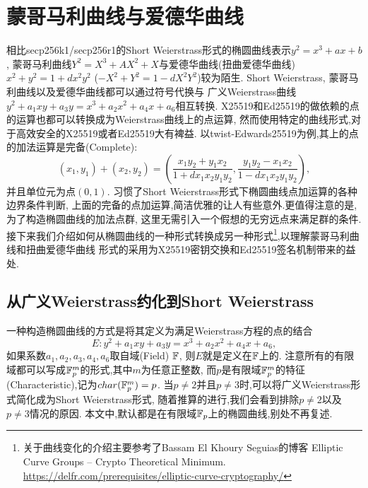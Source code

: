\section{蒙哥马利曲线与爱德华曲线}

相比secp256k1/secp256r1的Short Weierstrass形式的椭圆曲线表示$y^2 = x^3 + ax + b$,
蒙哥马利曲线$Y^2 = X^3 + AX^2 + X$与爱德华曲线(扭曲爱德华曲线) 
$x^2+y^2 = 1  + dx^2y^2$ ($-X^2+Y^2 = 1  - dX^2Y^2$)较为陌生.
Short Weierstrass, 蒙哥马利曲线以及爱德华曲线都可以通过符号代换与
广义Weierstrass曲线$y^2 + a_1xy + a_3y = x^3 + a_2x^2 + a_4x + a_6$相互转换.
X25519和Ed25519的做依赖的点的运算也都可以转换成为Weierstrass曲线上的点运算,
然而使用特定的曲线形式,对于高效安全的X25519或者Ed25519大有裨益.
以twist-Edwards25519为例,其上的点的加法运算是完备(Complete):
$$
(x_1, y_1) + (x_2, y_2) = \left( \frac{x_1y_2 + y_1x_2}{1 + dx_1x_2y_1y_2}, \frac{y_1y_2 - x_1x_2}{1-dx_1x_2y_1y_2} \right),
$$
并且单位元为点$(0,1)$. 习惯了Short Weierstrass形式下椭圆曲线点加运算的各种边界条件判断,
上面的完备的点加运算,简洁优雅的让人有些意外.更值得注意的是,为了构造椭圆曲线的加法点群,
这里无需引入一个假想的无穷远点来满足群的条件.
接下来我们介绍如何从椭圆曲线的一种形式转换成另一种形式\footnote{
关于曲线变化的介绍主要参考了Bassam El Khoury Seguias的博客
Elliptic Curve Groups – Crypto Theoretical Minimum.
\url{https://delfr.com/prerequisites/elliptic-curve-cryptography/}
},以理解蒙哥马利曲线和扭曲爱德华曲线
形式的采用为X25519密钥交换和Ed25519签名机制带来的益处.

\subsection{从广义Weierstrass约化到Short Weierstrass}

一种构造椭圆曲线的方式是将其定义为满足Weierstrass方程的点的结合
\begin{equation}\label{eq-gw}
E: y^2 + a_1xy + a_3y = x^3 + a_2x^2 + a_4x + a_6,
\end{equation}
如果系数$a_1, a_2, a_3, a_4, a_6$取自域(Field) $\mathbb{F}$, 则$E$就是定义在$\mathbb{F}$上的.
注意所有的有限域都可以写成$\mathbb{F}_p^m$的形式,其中$m$为任意正整数,
而$p$是有限域$\mathbb{F}_p^m$的特征(Characteristic),记为$char(\mathbb{F}_p^m)=p$.
当$p\neq 2$并且$p\neq3$时,可以将广义Weierstrass形式简化成为Short Weierstrass形式,
随着推算的进行,我们会看到排除$p\neq 2$以及$p\neq3$情况的原因.
本文中,默认都是在有限域$\mathbb{F}_p$上的椭圆曲线,别处不再复述.

